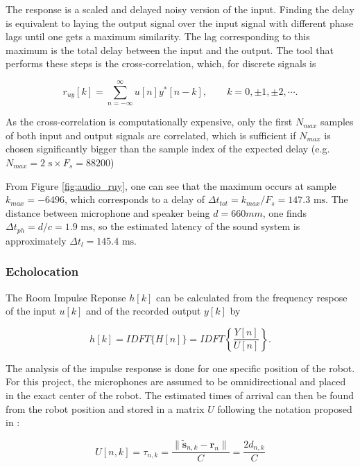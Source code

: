 The response is a scaled and delayed noisy version of the input. 
Finding the delay is equivalent to laying the output signal over the input signal with different phase lags until one gets a maximum similarity. The lag corresponding to this maximum is the total delay between the input and the output. The tool that performs these steps is the cross-correlation, which, for discrete signals is 

\begin{equation}
	r_{uy}[k] = \sum\limits_{n=-\infty}^{\infty} u[n]y^*[n-k], \hspace{2em} k=0,\pm1,\pm2,\cdots .
\end{equation}

As the cross-correlation is computationally expensive, only the first $N_{max}$ samples of both input and output signals are correlated, which is sufficient if $N_{max}$ is chosen significantly bigger than the sample index of the expected delay (e.g. $N_{max}=2  \text{ s} \times F_s = 88200$)

From Figure \ref{fig:audio_ruy}, one can see that the maximum occurs at sample $k_{max}=-6496$, which corresponds to a delay of $\Delta t_{tot}=k_{max}/F_s=147.3 \text{ ms}$. 
The distance between microphone and speaker being $d=660mm$, one finds $\Delta t_{ph} = d/c=1.9  \text{ ms}$, so the estimated latency of the sound system is approximately $\Delta t_{l}=145.4 \text{ ms}$.

\subsubsection{Echolocation}

The Room Impulse Reponse $h[k]$ can be calculated from the frequency respose of the input $u[k]$ and of the recorded output $y[k]$ by

\begin{equation}
    h[k] = IDFT\{H[n]\} = IDFT\left\{\frac{Y[n]}{U[n]}\right\}.
    \label{eq:impulse}
\end{equation}

The analysis of the impulse response is done for one specific position of the robot. For this project, the microphones are assumed to be omnidirectional and placed in the exact center of the robot. 
The estimated times of arrival can then be found from the robot position and stored in a matrix $U$ following the notation proposed in \cite{Miranda}:

\begin{equation}
    U[n,k]=\tau_{n,k}=\frac{\| \tilde{\mathbf{s}}_{n,k}-\mathbf{r}_{n} \|}{C}=\frac{2d_{n,k}}{C}
    \label{eq:TOA}
\end{equation}

